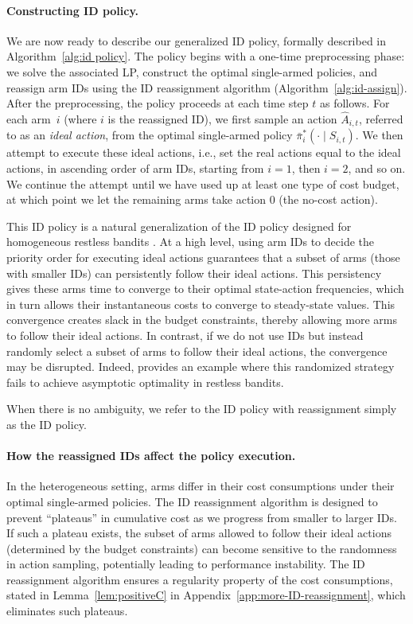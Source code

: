 \documentclass{article}
\theoremstyle{plain}
\theoremstyle{remark}
\newcommand{\pibar}{{\sysbar{\pi}}}
\newcommand{\sysbar}[1]{\bar{#1}}
\begin{document}
\paragraph{Constructing ID policy.}
We are now ready to describe our generalized ID policy, formally described in Algorithm~\ref{alg:id policy}.
The policy begins with a one-time preprocessing phase: we solve the associated LP, construct the optimal single-armed policies, and reassign arm IDs using the ID reassignment algorithm (Algorithm~\ref{alg:id-assign}).
After the preprocessing, the policy proceeds at each time step $t$ as follows.
For each arm~$i$ (where $i$ is the reassigned ID), we first sample an action $\widehat{A}_{i,t}$, referred to as an \emph{ideal action}, from the optimal single-armed policy $\pibar_i^*(\cdot \mid S_{i,t})$.
We then attempt to execute these ideal actions, i.e., set the real actions equal to the ideal actions, in ascending order of arm IDs, starting from $i=1$, then $i=2$, and so on.
We continue the attempt until we have used up at least one type of cost budget, at which point we let the remaining arms take action $0$ (the no-cost action). 

This ID policy is a natural generalization of the ID policy designed for homogeneous restless bandits \cite{HonXieChe_24}.
At a high level, using arm IDs to decide the priority order for executing ideal actions guarantees that a subset of arms (those with smaller IDs) can persistently follow their ideal actions.
This persistency gives these arms time to converge to their optimal state-action frequencies, which in turn allows their instantaneous costs to converge to steady-state values. This convergence creates slack in the budget constraints, thereby allowing more arms to follow their ideal actions. 
In contrast, if we do not use IDs but instead randomly select a subset of arms to follow their ideal actions, the convergence may be disrupted. 
Indeed, \cite{HonXieChe_23} provides an example where this randomized strategy fails to achieve asymptotic optimality in restless bandits.

When there is no ambiguity, we refer to the ID policy with reassignment simply as the ID policy.


\paragraph{How the reassigned IDs affect the policy execution.}
In the heterogeneous setting, arms differ in their cost consumptions under their optimal single-armed policies.
The ID reassignment algorithm is designed to prevent ``plateaus'' in cumulative cost as we progress from smaller to larger IDs.
If such a plateau exists, the subset of arms allowed to follow their ideal actions (determined by the budget constraints) can become sensitive to the randomness in action sampling, potentially leading to performance instability.
The ID reassignment algorithm ensures a regularity property of the cost consumptions, stated in Lemma~\ref{lem:positiveC} in Appendix~\ref{app:more-ID-reassignment}, which eliminates such plateaus.
\end{document}
